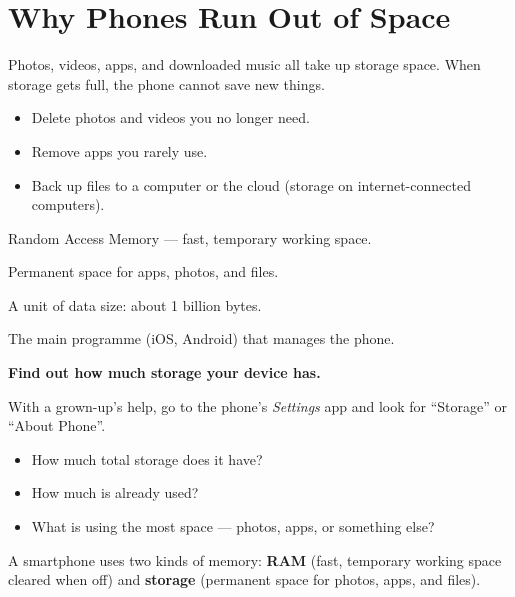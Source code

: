 \sectionrule

\section*{Why Phones Run Out of Space}

Photos, videos, apps, and downloaded music all take up storage space.
When storage gets full, the phone cannot save new things.

\begin{itemize}
  \item Delete photos and videos you no longer need.
  \item Remove apps you rarely use.
  \item Back up files to a computer or the cloud (storage on internet-connected computers).
\end{itemize}

\sectionrule

\begin{newwords}
  \begin{description}[labelwidth=3.5cm, leftmargin=3.7cm]
    \item[\term{RAM}]          Random Access Memory — fast, temporary working space.
    \item[\term{Storage}]      Permanent space for apps, photos, and files.
    \item[\term{Gigabyte (GB)}] A unit of data size: about 1 billion bytes.
    \item[\term{Operating system}] The main programme (iOS, Android) that manages the phone.
  \end{description}
\end{newwords}

\sectionrule

\begin{tryit}
  \textbf{Find out how much storage your device has.}

  With a grown-up's help, go to the phone's \emph{Settings} app
  and look for ``Storage'' or ``About Phone''.
  \begin{itemize}
    \item How much total storage does it have?
    \item How much is already used?
    \item What is using the most space — photos, apps, or something else?
  \end{itemize}
\end{tryit}

\sectionrule

\begin{bigidea}
  A smartphone uses two kinds of memory:
  \textbf{RAM} (fast, temporary working space cleared when off)
  and \textbf{storage} (permanent space for photos, apps, and files).
\end{bigidea}

